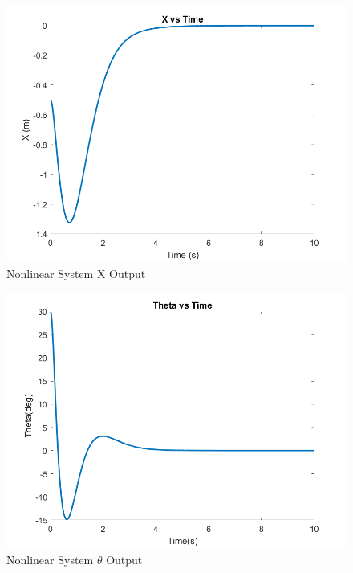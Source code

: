 \begin{figure}[!ht]
    \centering
    \includegraphics[width=\linewidth]{figs/sf_nlin_x.png}
    \caption{Nonlinear System X Output}
    \label{}
\end{figure}

\begin{figure}[!ht]
    \centering
    \includegraphics[width=\linewidth]{figs/sf_nlin_theta.png}
    \caption{Nonlinear System $\theta$ Output}
    \label{}
\end{figure}

